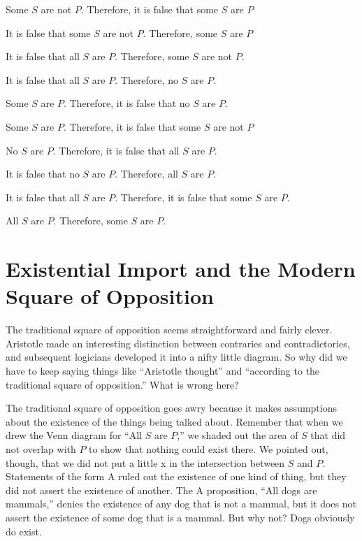 \begin{exercises}
\item Some $S$ are not $P$. Therefore, it is false that some $S$ are $P$
\item It is false that some $S$ are not $P$. Therefore, some $S$ are $P$
\item It is false that all $S$ are $P$. Therefore, some $S$ are not $P$.
\item It is false that all $S$ are $P$. Therefore, no $S$ are $P$.
\item Some $S$ are $P$. Therefore, it is false that no $S$ are $P$.
\item Some $S$ are $P$. Therefore, it is false that some $S$ are not $P$
\item No $S$ are $P$. Therefore, it is false that all $S$ are $P$.
\item It is false that no $S$ are $P$. Therefore, all $S$ are $P$.
\item It is false that all $S$ are $P$. Therefore, it is false that some $S$ are $P$.
\item All $S$ are $P$. Therefore, some $S$ are $P$.
\end{exercises}


\section{Existential Import and the Modern Square of Opposition}
\label{sec:ExistentialImport}

The traditional square of opposition seems straightforward and fairly clever. Aristotle made an interesting distinction between contraries and contradictories, and subsequent logicians developed it into a nifty little diagram. So why did we have to keep saying things like ``Aristotle thought'' and ``according to the traditional square of opposition.'' What is wrong here?

The traditional square of opposition goes awry because it makes assumptions about the existence of the things being talked about. Remember that when we drew the Venn diagram for ``All $S$ are $P$,'' we shaded out the area of $S$ that did not overlap with $P$ to show that nothing could exist there. We pointed out, though, that we did not put a little x in the intersection between $S$ and $P$. Statements of the form A ruled out the existence of one kind of thing, but they did not assert the existence of another. The A proposition, ``All dogs are mammals,'' denies the existence of any dog that is not a mammal, but it does not assert the existence of some dog that is a mammal. But why not? Dogs obviously do exist.

